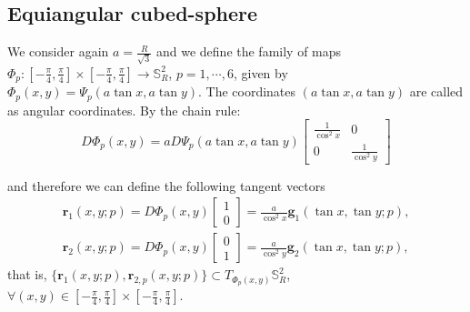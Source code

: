 \subsection{Equiangular cubed-sphere}
\label{equiangular-cs}
We consider again $a=\frac{R}{\sqrt{3}}$
and we define the family of maps
$\Phi_{p}: [-\frac{\pi}{4},\frac{\pi}{4}] 
\times [-\frac{\pi}{4},\frac{\pi}{4}] 
\to \mathbb{S}^2_R$, $p=1, \cdots, 6$,
given by $\Phi_{p}(x,y) = \Psi_{p}(a\tan{x}, a\tan{y})$.
The coordinates $(a\tan{x}, a\tan{y})$ are called as angular coordinates.
By the chain rule:
\begin{equation}
	D\Phi_{p}(x,y) = a
	D\Psi_{p}(a\tan{x}, a\tan{y})
	\begin{bmatrix}
		\frac{1}{\cos^2 x} & 0 \\ 
		0 & \frac{1}{\cos^2 y} 
	\end{bmatrix}	
\end{equation}

and therefore we can define the following tangent vectors
\begin{align}
	\boldsymbol{r}_{1}(x,y;p) = D\Phi_{p}(x,y)
	\begin{bmatrix}
		 1 \\
		 0
	\end{bmatrix}
	= \frac{a}{\cos^2 x}
	\boldsymbol{g}_{1}(\tan{x}, \tan{y}; p)
	,\\
	\boldsymbol{r}_{2}(x, y ;p) = D\Phi_{p}(x,y)
	\begin{bmatrix}
		 0 \\
		 1
	\end{bmatrix}
	= \frac{a}{\cos^2 y}
	\boldsymbol{g}_{2}(\tan{x}, \tan{y}; p),
\end{align}
that is, $\{\boldsymbol{r}_{1}(x,y;p),\boldsymbol{r}_{2,p}(x,y;p)\} \subset T_{\Phi_p(x,y)}
\mathbb{S}_{R}^2$, $\forall (x,y) \in 
[-\frac{\pi}{4},\frac{\pi}{4}] 
\times [-\frac{\pi}{4},\frac{\pi}{4}]$.


